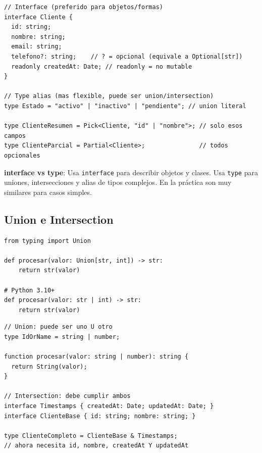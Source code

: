 \documentclass[11pt,a4paper]{article}
\begin{document}
\begin{tsbox}
\begin{lstlisting}[style=typescript]
// Interface (preferido para objetos/formas)
interface Cliente {
  id: string;
  nombre: string;
  email: string;
  telefono?: string;    // ? = opcional (equivale a Optional[str])
  readonly createdAt: Date; // readonly = no mutable
}

// Type alias (mas flexible, puede ser union/intersection)
type Estado = "activo" | "inactivo" | "pendiente"; // union literal

type ClienteResumen = Pick<Cliente, "id" | "nombre">; // solo esos campos
type ClienteParcial = Partial<Cliente>;               // todos opcionales
\end{lstlisting}
\end{tsbox}

\begin{tipbox}
\textbf{interface vs type}: Usa \texttt{interface} para describir objetos y clases.
Usa \texttt{type} para uniones, intersecciones y alias de tipos complejos.
En la práctica son muy similares para casos simples.
\end{tipbox}

\subsection{Union e Intersection}

\begin{pybox}
\begin{lstlisting}[style=python]
from typing import Union

def procesar(valor: Union[str, int]) -> str:
    return str(valor)

# Python 3.10+
def procesar(valor: str | int) -> str:
    return str(valor)
\end{lstlisting}
\end{pybox}

\begin{tsbox}
\begin{lstlisting}[style=typescript]
// Union: puede ser uno U otro
type IdOrName = string | number;

function procesar(valor: string | number): string {
  return String(valor);
}

// Intersection: debe cumplir ambos
interface Timestamps { createdAt: Date; updatedAt: Date; }
interface ClienteBase { id: string; nombre: string; }

type ClienteCompleto = ClienteBase & Timestamps;
// ahora necesita id, nombre, createdAt Y updatedAt
\end{lstlisting}
\end{tsbox}
\end{document}
